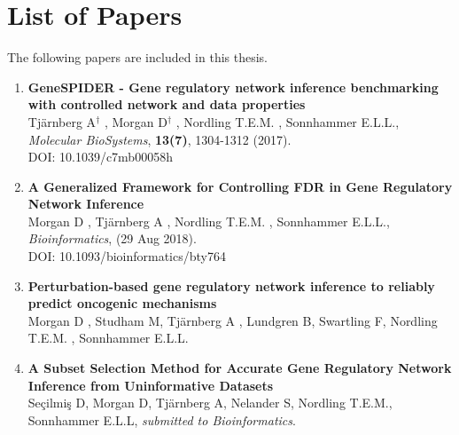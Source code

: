 \chapter{List of Papers}

\vspace{-5pt} %

The following papers are included in this thesis.

\vspace{0pt} %


\begin{enumerate}[P{A}PER I: ]

\setlength{\itemsep}{3.3mm} %



\item\textbf{GeneSPIDER - Gene regulatory network inference benchmarking with controlled network and data properties}\\
Tj{\"a}rnberg A\textit{$^{\dagger}$} , Morgan D\textit{$^{\dagger}$} ,  Nordling T.E.M. , Sonnhammer E.L.L., \emph{Molecular BioSystems}, \textbf{13(7)}, 1304-1312 (2017).\\
DOI: 10.1039/c7mb00058h{} 

\item\textbf{A Generalized Framework for Controlling FDR in Gene Regulatory Network Inference}\\
Morgan D , Tj{\"a}rnberg A , Nordling T.E.M. , Sonnhammer E.L.L., \emph{Bioinformatics}, (29 Aug 2018).\\
DOI: 10.1093/bioinformatics/bty764{} 

\item\textbf{Perturbation-based gene regulatory network inference to reliably predict oncogenic mechanisms}\\
Morgan D , Studham M, Tj{\"a}rnberg A , Lundgren B, Swartling F, Nordling T.E.M. , Sonnhammer E.L.L.

\item\textbf{A Subset Selection Method for Accurate Gene Regulatory Network Inference from Uninformative Datasets}\\
Seçilmiş D, Morgan D, Tj{\"a}rnberg A, Nelander S, Nordling T.E.M., Sonnhammer E.L.L, \emph{submitted to Bioinformatics}.


\end{enumerate}
